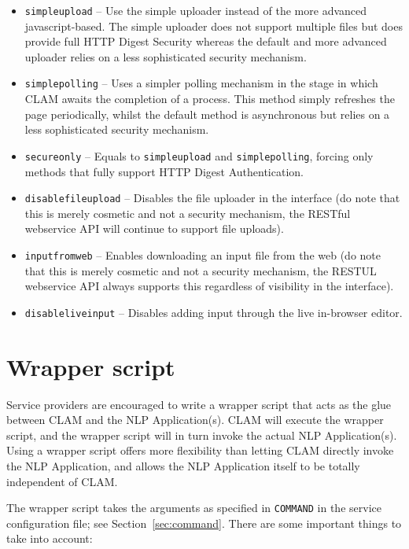 \documentclass[a4paper,12pt]{report}
\begin{document}
\begin{itemize}
\item \texttt{simpleupload} -- Use the simple uploader instead of the more advanced javascript-based. The simple uploader does not support multiple files but does provide full HTTP Digest Security whereas the default and more advanced uploader relies on a less sophisticated security mechanism.
\item \texttt{simplepolling} -- Uses a simpler polling mechanism in the stage in which CLAM awaits the completion of a process. This method simply refreshes the page periodically, whilst the default method is asynchronous but relies on a less sophisticated security mechanism. 
\item \texttt{secureonly} -- Equals to \texttt{simpleupload} and \texttt{simplepolling}, forcing only methods that fully support HTTP Digest Authentication.
\item \texttt{disablefileupload} -- Disables the file uploader in the interface (do note that this is merely cosmetic and not a security mechanism, the RESTful webservice API will continue to support file uploads).
\item \texttt{inputfromweb} -- Enables downloading an input file from the web (do note that this is merely cosmetic and not a security mechanism, the RESTUL webservice API always supports this regardless of visibility in the interface).
\item \texttt{disableliveinput} -- Disables adding input through the live in-browser editor. 
\end{itemize}



\section{Wrapper script}

Service providers are encouraged to write a wrapper script that acts as the
glue between CLAM and the NLP Application(s). CLAM will execute the wrapper
script, and the wrapper script will in turn invoke the actual NLP
Application(s). Using a wrapper script offers more flexibility than letting
CLAM directly invoke the NLP Application, and allows the NLP Application itself
to be totally independent of CLAM. 

The wrapper script takes the arguments as specified in \texttt{COMMAND} in the
service configuration file; see Section~\ref{sec:command}. There are some
important things to take into account:
\end{document}
